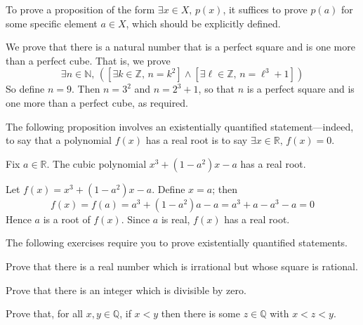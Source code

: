 \begin{strategy}
\label{strProvingExistential}
To prove a proposition of the form $\exists x \in X,\, p(x)$, it suffices to prove $p(a)$ for some specific element $a \in X$, which should be explicitly defined.
\end{strategy}

\begin{example}
We prove that there is a natural number that is a perfect square and is one more than a perfect cube. That is, we prove
\[\exists n \in \mathbb{N},\, ([\exists k \in \mathbb{Z},\, n=k^2] \wedge [\exists \ell \in \mathbb{Z},\, n=\ell^3 + 1])\]
So define $n=9$. Then $n=3^2$ and $n=2^3+1$, so that $n$ is a perfect square and is one more than a perfect cube, as required.
\end{example}

The following proposition involves an existentially quantified statement---indeed, to say that a polynomial $f(x)$ has a real root is to say $\exists x \in \mathbb{R},\, f(x) = 0$.

\begin{proposition}
Fix $a \in \mathbb{R}$. The cubic polynomial $x^3 + (1-a^2)x - a$ has a real root.
\end{proposition}
\begin{cproof}
Let $f(x)=x^3+(1-a^2)x-a$. Define $x=a$; then
\[f(x) = f(a) = a^3 + (1-a^2)a - a = a^3 + a - a^3 - a = 0\]
Hence $a$ is a root of $f(x)$. Since $a$ is real, $f(x)$ has a real root.
\end{cproof}

The following exercises require you to prove existentially quantified statements.

\begin{exercise}
Prove that there is a real number which is irrational but whose square is rational.
\end{exercise}

\begin{exercise}
Prove that there is an integer which is divisible by zero.
\end{exercise}

\begin{example}
Prove that, for all $x,y \in \mathbb{Q}$, if $x < y$ then there is some $z \in \mathbb{Q}$ with $x<z<y$.
\end{example}

